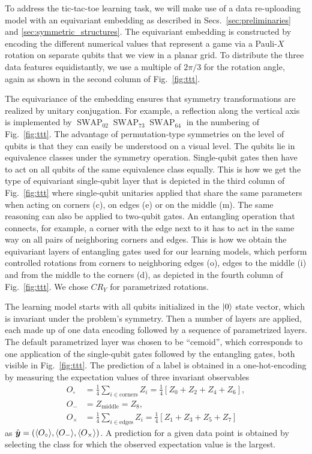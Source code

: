 \documentclass[a4paper,twocolumn,notitlepage,nofootinbib,superscriptaddress,floatfix]{revtex4-2}
\newcommand{\SWAP}{\ensuremath{\operatorname{SWAP}}}
\begin{document}
To address the tic-tac-toe learning task, we will make use of a data re-uploading model with an equivariant embedding as described in Secs.~\ref{sec:preliminaries} and \ref{sec:symmetric_structures}. 
The equivariant embedding is constructed by encoding the different numerical values that represent a game via a Pauli-$X$ rotation on separate qubits that we view in a planar grid. To distribute the three data features equidistantly, we use a multiple of $2\pi/3$ for the rotation angle, again as shown in the second column of Fig.~\ref{fig:ttt}.  

The equivariance of the embedding ensures that symmetry transformations are realized by unitary conjugation. For example, a reflection along the vertical axis is implemented by $\SWAP_{02}\SWAP_{73}\SWAP_{64}$ in the numbering of Fig.~\ref{fig:ttt}. The advantage of permutation-type symmetries on the level of qubits is that they can easily be understood on a visual level. 
The qubits lie in equivalence classes under the symmetry operation. Single-qubit gates then have to act on all qubits of the same equivalence class equally. This is how we get the type of equivariant single-qubit layer that is depicted in the third column of Fig.~\ref{fig:ttt} where single-qubit unitaries applied that share the same parameters when acting on corners (c), on edges (e) or on the middle (m). The same reasoning can also be applied to two-qubit gates. An entangling operation that connects, for example, a corner with the edge next to it has to act in the same way on all pairs of neighboring corners and edges. This is how we obtain the equivariant layers of entangling gates used for our learning models, which perform controlled rotations from corners to neighboring edges (o), edges to the middle (i) and from the middle to the corners (d), as depicted in the fourth column of Fig.~\ref{fig:ttt}. We chose $CR_Y$ for parametrized rotations.

The learning model starts with all qubits initialized in the $\ket{0}$ state vector, which is invariant under the problem's symmetry. Then a number of layers are applied, each made up of one data encoding followed by a sequence of parametrized layers. The default parametrized layer was chosen to be \enquote{cemoid}, which corresponds to one application of the single-qubit gates followed by the entangling gates, both visible in Fig.~\ref{fig:ttt}. The prediction of a label is obtained in a one-hot-encoding by measuring the expectation values of three invariant observables
\begin{align}
    O_{\circ} &= \frac{1}{4}\sum_{i \in \text{corners}} Z_i= \frac{1}{4}[Z_0 + Z_2 + Z_4 + Z_6],\\
    O_{-} &= Z_{\text{middle}} = Z_8, \\
    O_{\times} &= \frac{1}{4}\sum_{i \in \text{edges}} Z_i = \frac{1}{4}[Z_1 + Z_3 + Z_5 + Z_7]
\end{align} 
as $\hat{\boldsymbol{y}} = (\langle O_{\circ} \rangle, \langle O_{-}\rangle, \langle O_{\times} \rangle)$.  A prediction for a given data point is obtained by selecting the class for which the observed expectation value is the largest.
\end{document}
